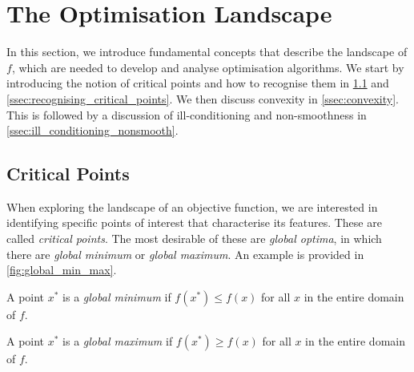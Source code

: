 \section{The Optimisation Landscape}

\label{sec:optimisation_landscape}

In this section, we introduce fundamental concepts that describe the landscape of $f$, which are needed to develop and analyse optimisation algorithms. We start by introducing the notion of critical points and how to recognise them in \cref{ssec:critical_points} and \cref{ssec:recognising_critical_points}. We then discuss convexity in \cref{ssec:convexity}. This is followed by a discussion of ill-conditioning and non-smoothness in \cref{ssec:ill_conditioning_nonsmooth}.



\subsection{Critical Points}

\label{ssec:critical_points}



When exploring the landscape of an objective function, we are interested in identifying specific points of interest that characterise its features. These are called \textit{critical points}. The most desirable of these are \textit{global optima}, in which there are \textit{global minimum} or \textit{global maximum}. An example is provided in \cref{fig:global_min_max}.



\begin{definition}

    A point $x^*$ is a \textit{global minimum} if $f(x^*) \leq f(x)$ for all $x$ in the entire domain of $f$.

\end{definition}



\begin{definition}

    A point $x^*$ is a \textit{global maximum} if $f(x^*) \geq f(x)$ for all $x$ in the entire domain of $f$.

\end{definition}



